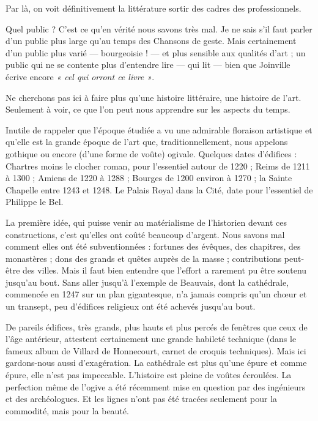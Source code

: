 \documentclass[french,twoside]{book} %
\begin{document}
Par là, on voit définitivement la littérature sortir des cadres des professionnels.\par
Quel public ? C’est ce qu’en vérité nous savons très mal. Je ne sais s’il faut parler d’un public plus large qu’au temps des Chansons de geste. Mais certainement d’un public plus varié — bourgeoisie ! — et plus sensible aux qualités d’art ; un public qui ne se contente plus d’entendre lire — qui lit — bien que Joinville écrive encore \emph{« cel qui orront ce livre »}.\par
\bigbreak
\noindent Ne cherchons pas ici à faire plus qu’une histoire littéraire, une histoire de l’art. Seulement à voir, ce que l’on peut nous apprendre sur les aspects du temps.\par
Inutile de rappeler que l’époque étudiée a vu une admirable floraison artistique et qu’elle est la grande époque de l’art que, traditionnellement, nous appelons gothique ou encore (d’une forme de voûte) ogivale. Quelques dates d’édifices : Chartres moins le clocher roman, pour l’essentiel autour de 1220 ; Reims de 1211 à 1300 ; Amiens de 1220 à 1288 ; Bourges de 1200 environ à 1270 ; la Sainte Chapelle entre 1243 et 1248. Le Palais Royal dans la Cité, date pour l’essentiel de Philippe le Bel.\par
La première idée, qui puisse venir au matérialisme de l’historien devant ces constructions, c’est qu’elles ont coûté beaucoup d’argent. Nous savons mal comment elles ont été subventionnées : fortunes des évêques, des chapitres, des monastères ; dons des grands et quêtes auprès de la masse ; contributions peut-être des villes. Mais il faut bien entendre que l’effort a rarement pu être soutenu jusqu’au bout. Sans aller jusqu’à l’exemple de Beauvais, dont la cathédrale, commencée en 1247 sur un plan gigantesque, n’a jamais compris qu’un chœur et un transept, peu d’édifices religieux ont été achevés jusqu’au bout.\par
De pareils édifices, très grands, plus hauts et plus percés de fenêtres que ceux de l’âge antérieur, attestent certainement une grande habileté technique (dans le fameux album de Villard de Honnecourt, carnet de croquis techniques). Mais ici gardons-nous aussi d’exagération. La cathédrale est plus qu’une épure et comme  
\label{p124} épure, elle n’est pas impeccable. L’histoire est pleine de voûtes écroulées. La perfection même de l’ogive a été récemment mise en question par des ingénieurs et des archéologues. Et les lignes n’ont pas été tracées seulement pour la commodité, mais pour la beauté.\par
\end{document}
